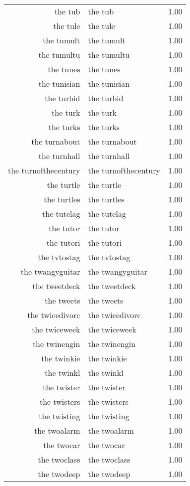 \begin{table}[ht]
\begin{tabular}{rlr}
  the tub & the tub & 1.00 \\ 
  the tule & the tule & 1.00 \\ 
  the tumult & the tumult & 1.00 \\ 
  the tumultu & the tumultu & 1.00 \\ 
  the tunes & the tunes & 1.00 \\ 
  the tunisian & the tunisian & 1.00 \\ 
  the turbid & the turbid & 1.00 \\ 
  the turk & the turk & 1.00 \\ 
  the turks & the turks & 1.00 \\ 
  the turnabout & the turnabout & 1.00 \\ 
  the turnhall & the turnhall & 1.00 \\ 
  the turnofthecentury & the turnofthecentury & 1.00 \\ 
  the turtle & the turtle & 1.00 \\ 
  the turtles & the turtles & 1.00 \\ 
  the tutelag & the tutelag & 1.00 \\ 
  the tutor & the tutor & 1.00 \\ 
  the tutori & the tutori & 1.00 \\ 
  the tvtostag & the tvtostag & 1.00 \\ 
  the twangyguitar & the twangyguitar & 1.00 \\ 
  the tweetdeck & the tweetdeck & 1.00 \\ 
  the tweets & the tweets & 1.00 \\ 
  the twicedivorc & the twicedivorc & 1.00 \\ 
  the twiceweek & the twiceweek & 1.00 \\ 
  the twinengin & the twinengin & 1.00 \\ 
  the twinkie & the twinkie & 1.00 \\ 
  the twinkl & the twinkl & 1.00 \\ 
  the twister & the twister & 1.00 \\ 
  the twisters & the twisters & 1.00 \\ 
  the twisting & the twisting & 1.00 \\ 
  the twoalarm & the twoalarm & 1.00 \\ 
  the twocar & the twocar & 1.00 \\ 
  the twoclass & the twoclass & 1.00 \\ 
  the twodeep & the twodeep & 1.00 \\ 

\end{tabular}
\end{table}
